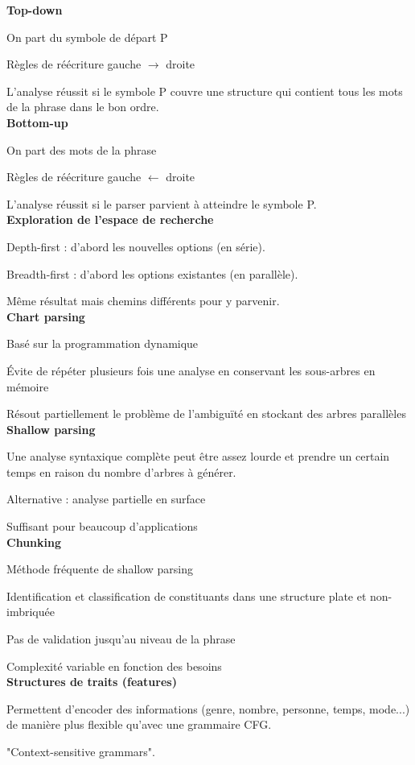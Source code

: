 \textbf{Top-down}

On part du symbole de départ P

Règles de réécriture gauche $\rightarrow$ droite

L'analyse réussit si le symbole P couvre une structure qui contient tous les mots de la phrase dans le bon ordre.\\

\textbf{Bottom-up}

On part des mots de la phrase

Règles de réécriture gauche $\leftarrow$ droite

L'analyse réussit si le parser parvient à atteindre le symbole P.\\


\textbf{Exploration de l'espace de recherche}

Depth-first : d'abord les nouvelles options (en série).

Breadth-first : d'abord les options existantes (en parallèle).

Même résultat mais chemins différents pour y parvenir.\\

\textbf{Chart parsing}

Basé sur la programmation dynamique

Évite de répéter plusieurs fois une analyse en conservant les sous-arbres en mémoire

Résout partiellement le problème de l'ambiguïté en stockant des arbres parallèles\\

\textbf{Shallow parsing}

Une analyse syntaxique complète peut être assez lourde et prendre un certain temps en raison du nombre d'arbres à générer.

Alternative : analyse partielle en surface

Suffisant pour beaucoup d'applications\\

\textbf{Chunking}

Méthode fréquente de shallow parsing

Identification et classification de constituants dans une structure plate et non-imbriquée

Pas de validation jusqu'au niveau de la phrase

Complexité variable en fonction des besoins\\

\textbf{Structures de traits (features)}

Permettent d'encoder des informations (genre, nombre, personne, temps, mode...) de manière plus flexible qu'avec une grammaire CFG.

"Context-sensitive grammars".\\
